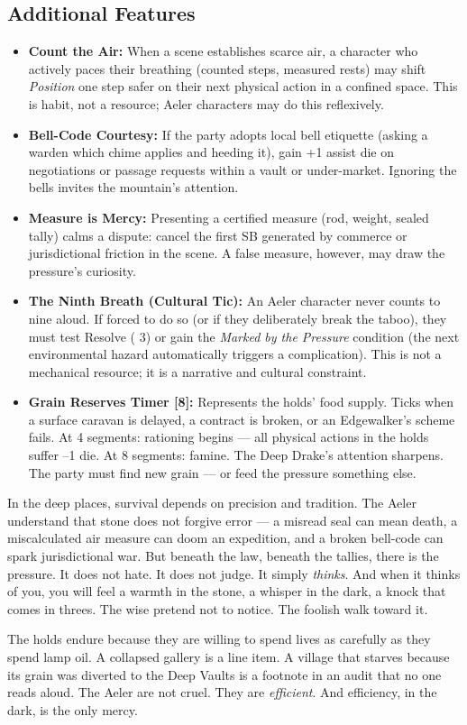 \subsection*{Additional Features}
\begin{itemize}
\item \textbf{Count the Air:} When a scene establishes scarce air, a character who actively paces their breathing (counted steps, measured rests) may shift \emph{Position} one step safer on their next physical action in a confined space. This is habit, not a resource; Aeler characters may do this reflexively.
\item \textbf{Bell-Code Courtesy:} If the party adopts local bell etiquette (asking a warden which chime applies and heeding it), gain +1 assist die on negotiations or passage requests within a vault or under-market. Ignoring the bells invites the mountain's attention.
\item \textbf{Measure is Mercy:} Presenting a certified measure (rod, weight, sealed tally) calms a dispute: cancel the first SB generated by commerce or jurisdictional friction in the scene. A false measure, however, may draw the pressure's curiosity.
\item \textbf{The Ninth Breath (Cultural Tic):} An Aeler character never counts to nine aloud. If forced to do so (or if they deliberately break the taboo), they must test Resolve (\DV{} 3) or gain the \emph{Marked by the Pressure} condition (the next environmental hazard automatically triggers a complication). This is not a mechanical resource; it is a narrative and cultural constraint.
\item \textbf{Grain Reserves Timer [8]:} Represents the holds' food supply. Ticks when a surface caravan is delayed, a contract is broken, or an Edgewalker's scheme fails. At 4 segments: rationing begins --- all physical actions in the holds suffer --1 die. At 8 segments: famine. The Deep Drake's attention sharpens. The party must find new grain --- or feed the pressure something else.
\end{itemize}

\begin{tcolorbox}[colback=black!3,colframe=black!40!white,title={Stone \& Sovereignty},breakable]
In the deep places, survival depends on precision and tradition. The Aeler understand that stone does not forgive error --- a misread seal can mean death, a miscalculated air measure can doom an expedition, and a broken bell-code can spark jurisdictional war. But beneath the law, beneath the tallies, there is the pressure. It does not hate. It does not judge. It simply \emph{thinks}. And when it thinks of you, you will feel a warmth in the stone, a whisper in the dark, a knock that comes in threes. The wise pretend not to notice. The foolish walk toward it.

The holds endure because they are willing to spend lives as carefully as they spend lamp oil. A collapsed gallery is a line item. A village that starves because its grain was diverted to the Deep Vaults is a footnote in an audit that no one reads aloud. The Aeler are not cruel. They are \textit{efficient}. And efficiency, in the dark, is the only mercy.
\end{tcolorbox}

